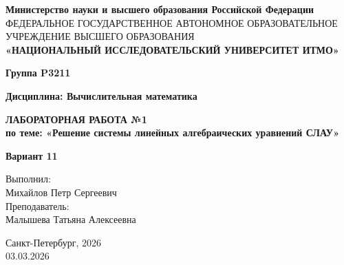 \documentclass[a4paper,12pt]{article}
\begin{document}
\begin{titlepage}
    \centering
    {\fontsize{11}{13}\selectfont \textbf{Министерство науки и высшего образования Российской Федерации}} \\
    {\fontsize{7}{10}\selectfont ФЕДЕРАЛЬНОЕ ГОСУДАРСТВЕННОЕ АВТОНОМНОЕ ОБРАЗОВАТЕЛЬНОЕ УЧРЕЖДЕНИЕ ВЫСШЕГО ОБРАЗОВАНИЯ} \\
    \vspace{0.2cm} 
    {\fontsize{14}{17}\selectfont \textbf{«НАЦИОНАЛЬНЫЙ ИССЛЕДОВАТЕЛЬСКИЙ УНИВЕРСИТЕТ ИТМО»}}
    
    \vspace{1cm} 
    
    {\fontsize{12}{14}\selectfont \textbf{Группа P3211}}
    
    \vspace{1cm}
    
    {\fontsize{12}{14}\selectfont \textbf{Дисциплина: Вычислительная математика}}
    
    \vspace*{\fill}
    
    {\fontsize{18}{22}\selectfont \textbf{ЛАБОРАТОРНАЯ РАБОТА №1}} \\
    \vspace{0.5cm}
    {\fontsize{14}{17}\selectfont \textbf{по теме: «Решение системы линейных алгебраических уравнений СЛАУ»}}
    
    \vspace{2cm}
    
    {\fontsize{12}{14}\selectfont \textbf{Вариант 11}}
    
    \vspace{2cm}
    
    \begin{flushright}
        \fontsize{12}{14}\selectfont
        Выполнил: \\
        Михайлов Петр Сергеевич \\
        \vspace{1em}
        Преподаватель: \\
        Малышева Татьяна Алексеевна
    \end{flushright}
    
    \vfill
    
    {\fontsize{12}{14}\selectfont
    Санкт-Петербург, 2026 \\
    03.03.2026
    }
\end{titlepage}
\end{document}
